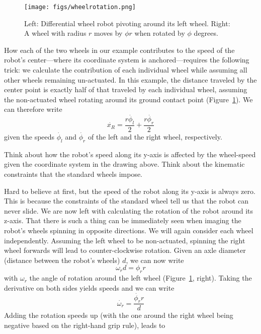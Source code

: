 \begin{figure}[htb!]
	\centering
		\texttt{[image: figs/wheelrotation.png]}
	\caption{Left: Differential wheel robot pivoting around its left wheel. Right: A wheel with radius $r$ moves by $\phi r$ when rotated by $\phi$ degrees.}
	\label{fig:wheelrotation}
\end{figure}

How each of the two wheels in our example contributes to the speed of the robot's center---where its coordinate system is anchored---requires the following trick: we calculate the contribution of each individual wheel while assuming all other wheels remaining un-actuated. In this example, the distance traveled by the center point is exactly half of that traveled by each individual wheel, assuming the non-actuated wheel rotating around its ground contact point (Figure~\ref{fig:wheelrotation}). We can therefore write
\begin{equation}
\dot{x_R}=\frac{r\dot{\phi_l}}{2}+\frac{r\dot{\phi_r}}{2}
\end{equation}
given the speeds $ \dot{\phi_l}$ and $ \dot{\phi_r}$ of the left and the right wheel, respectively.

\begin{framed}
Think about how the robot's speed along its y-axis is affected by the wheel-speed given the coordinate system in the drawing above. Think about the kinematic constraints that the standard wheels impose.
\end{framed}

Hard to believe at first, but the speed of the robot along its y-axis is always zero. This is because the constraints of the standard wheel tell us that the robot can never slide.  We are now left with calculating the rotation of the robot around its z-axis. That there is such a thing can be immediately seen when imaging the robot's wheels spinning in opposite directions. We will again consider each wheel independently. Assuming the left wheel to be non-actuated, spinning the right wheel forwards will lead to counter-clockwise rotation. Given an axle diameter (distance between the robot's wheels) $ d$, we can now write
\begin{equation}
\omega_r d = \phi_r r
\end{equation}
with $ \omega_r$ the angle of rotation around the left wheel (Figure~\ref{fig:wheelrotation}, right). Taking the derivative on both sides yields speeds and we can write
\begin{equation}
\dot{\omega_r} = \frac{\dot{\phi_r} r}{d}
\end{equation}
Adding the rotation speeds up (with the one around the right wheel being negative based on the right-hand grip rule), leads to

